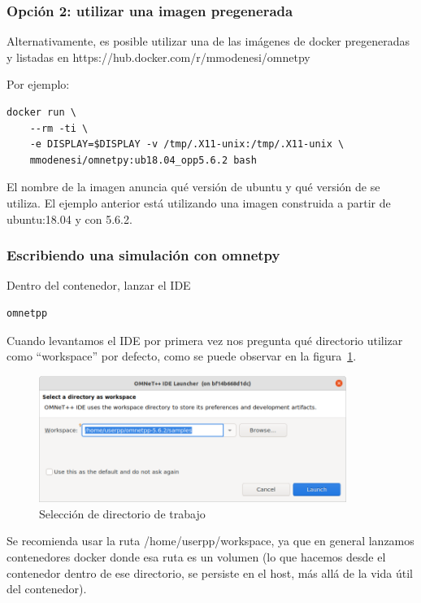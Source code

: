 \documentclass[]{article}
\begin{document}
\subsubsection{Opción 2: utilizar una imagen pregenerada}

Alternativamente, es posible utilizar una de las imágenes de docker
pregeneradas y listadas en https://hub.docker.com/r/mmodenesi/omnetpy

Por ejemplo:

\begin{verbatim}
docker run \
    --rm -ti \
    -e DISPLAY=$DISPLAY -v /tmp/.X11-unix:/tmp/.X11-unix \    
    mmodenesi/omnetpy:ub18.04_opp5.6.2 bash
\end{verbatim}

El nombre de la imagen anuncia qué versión de ubuntu y qué versión de \omnetpp{}
se utiliza. El ejemplo anterior está utilizando una imagen construida a partir
de ubuntu:18.04 y con \omnetpp{} 5.6.2.

\subsubsection{Escribiendo una simulación con omnetpy}

Dentro del contenedor, lanzar el IDE

\begin{verbatim}
omnetpp
\end{verbatim}

Cuando levantamos el IDE por primera vez nos pregunta qué directorio
utilizar como ``workspace'' por defecto, como se puede observar en la
figura~\ref{fig:workspace}.

\begin{figure}[h]
\caption{Selección de directorio de trabajo}
\label{fig:workspace}
\centering
\includegraphics[width=10cm]{workspace}
\end{figure}

Se recomienda usar la ruta /home/userpp/workspace, ya que en general lanzamos
contenedores docker donde esa ruta es un volumen (lo que hacemos desde el
contenedor dentro de ese directorio, se persiste en el host, más allá de la
vida útil del contenedor).
\end{document}
